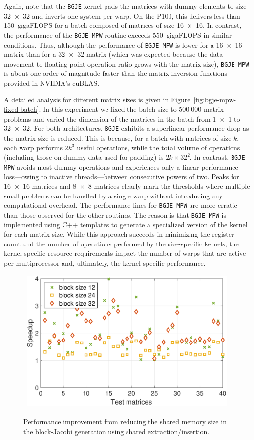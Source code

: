 Again, note that the {\tt BGJE} kernel pads the matrices with dummy
elements to size 32~$\times$~32 and inverts one system per warp. On the P100, this
delivers less than 150~gigaFLOPS for a batch composed of matrices of size 16~$\times$~16. 
In contrast, the performance of the {\tt BGJE-MPW} routine exceeds 550~gigaFLOPS in similar conditions.
Thus, although the performance of {\tt BGJE-MPW} is lower for a 16~$\times$~16 matrix
than for a 32~$\times$~32 matrix (which was expected because the
data-movement-to-floating-point-operation ratio grows with the matrix
size), {\tt BGJE-MPW} is about one order of magnitude faster than the matrix
inversion functions provided in NVIDIA's cuBLAS.

A detailed analysis for different matrix sizes is given in
Figure~\ref{fig:bgje-mpw-fixed-batch}. In this experiment we fixed the batch
size to 500,000 matrix problems and varied the dimension of the matrices in the
batch from 1~$\times$~1 to 32~$\times$~32. For both architectures, {\tt BGJE} exhibits a superlinear
performance drop as the matrix size is reduced. This is because,
for a batch with matrices of size $k$, each warp performs $2k^3$ useful
operations, while the total volume of operations (including those on dummy data
used for padding) is $2k \times 32^2$. In contrast, {\tt BGJE-MPW} avoids most
dummy operations and experiences only a linear performance loss---owing to
inactive threads---between consecutive powers of two. Peaks for 16~$\times$~16 matrices and
8~$\times$~8 matrices clearly mark the thresholds where multiple small problems can be handled by a
single warp without introducing any computational overhead. The performance
lines for {\tt BGJE-MPW} are more erratic than those observed for the other
routines. The reason is that {\tt BGJE-MPW} is implemented using C++ templates
to generate a specialized version of the kernel for each matrix size. While this
approach succeeds in minimizing the register count and the number of operations
performed by the size-specific kernels, the kernel-specific resource
requirements impact the number of warps that are active per multiprocessor and,
ultimately, the kernel-specific performance.

\begin{figure}
\begin{center}
{\scriptsize
\begin{tabular}{c}
\includegraphics[width=.48\columnwidth]{plots/shared_mem_improvement.pdf}
\end{tabular}
}
\end{center}
\caption{
Performance improvement from reducing the shared memory size in the 
block-Jacobi generation using shared extraction/insertion.
}
\label{fig:reducedshared}
\end{figure}

